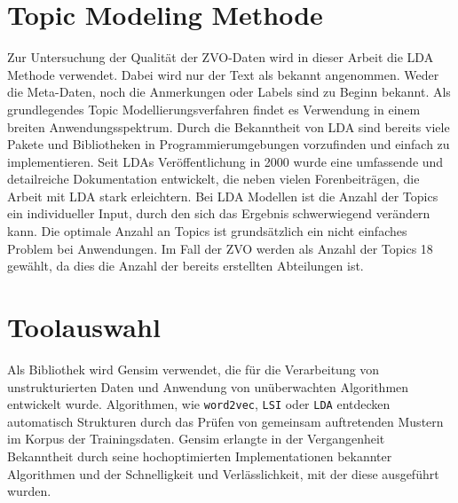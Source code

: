 \documentclass[german,version-2020-11]{uzl-thesis}
\begin{document}
\section{Topic Modeling Methode}
Zur Untersuchung der Qualität der ZVO-Daten wird in dieser Arbeit die LDA Methode verwendet. Dabei wird nur der Text als bekannt angenommen. Weder die Meta-Daten, noch die Anmerkungen oder Labels sind zu Beginn bekannt. Als grundlegendes Topic Modellierungsverfahren findet es Verwendung in einem breiten Anwendungsspektrum. Durch die Bekanntheit von LDA sind bereits viele Pakete und Bibliotheken in Programmierumgebungen vorzufinden und einfach zu implementieren. Seit LDAs Veröffentlichung in 2000 wurde eine umfassende und detailreiche Dokumentation entwickelt, die neben vielen Forenbeiträgen, die Arbeit mit LDA stark erleichtern. Bei LDA Modellen ist die Anzahl der Topics ein individueller Input, durch den sich das Ergebnis schwerwiegend verändern kann. Die optimale Anzahl an Topics ist grundsätzlich ein nicht einfaches Problem bei Anwendungen. Im Fall der ZVO werden als Anzahl der Topics 18  gewählt, da dies die Anzahl der bereits erstellten Abteilungen ist. 

\section{Toolauswahl}
Als Bibliothek wird Gensim verwendet, die für die Verarbeitung von unstrukturierten Daten und Anwendung von unüberwachten Algorithmen entwickelt wurde. Algorithmen, wie \lstinline{word2vec}, \lstinline{LSI} oder \lstinline{LDA} entdecken automatisch Strukturen durch das Prüfen von gemeinsam auftretenden Mustern im Korpus der Trainingsdaten. Gensim erlangte in der Vergangenheit Bekanntheit durch seine hochoptimierten Implementationen bekannter Algorithmen und der Schnelligkeit und Verlässlichkeit, mit der diese ausgeführt wurden.
\end{document}
